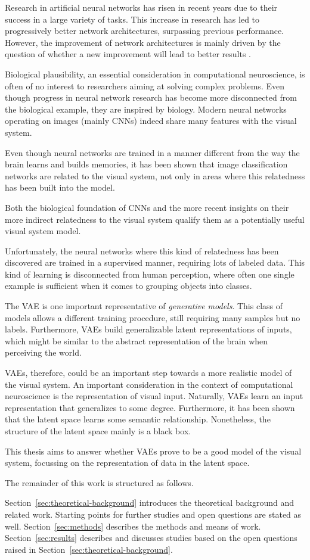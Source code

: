 Research in artificial neural networks has risen in recent years due to their success in a large variety of tasks.
This increase in research has led to progressively better network architectures, surpassing previous performance.
However, the improvement of network architectures is mainly driven by the question of whether a new improvement will lead to better results \citep{lindsay2020convolutional}.

Biological plausibility, an essential consideration in computational neuroscience, is often of no interest to researchers aiming at solving complex problems.
Even though progress in neural network research has become more disconnected from the biological example, they are inspired by biology.
Modern neural networks operating on images (mainly \acp{CNN}) indeed share many features with the visual system.

Even though neural networks are trained in a manner different from the way the brain learns and builds memories, it has been shown that image classification networks are related to the visual system, not only in areas where this relatedness has been built into the model.

Both the biological foundation of \acp{CNN} and the more recent insights on their more indirect relatedness to the visual system qualify them as a potentially useful visual system model.

Unfortunately, the neural networks where this kind of relatedness has been discovered are trained in a supervised manner, requiring lots of labeled data.
This kind of learning is disconnected from human perception, where often one single example is sufficient when it comes to grouping objects into classes.

The \ac{VAE} is one important representative of \textit{generative models}.
This class of models allows a different training procedure, still requiring many samples but no labels.
Furthermore, \acp{VAE} build generalizable latent representations of inputs, which might be similar to the abstract representation of the brain when perceiving the world.

\acp{VAE}, therefore, could be an important step towards a more realistic model of the visual system.
An important consideration in the context of computational neuroscience is the representation of visual input.
Naturally, \acp{VAE} learn an input representation that generalizes to some degree.
Furthermore, it has been shown that the latent space learns some semantic relationship.
Nonetheless, the structure of the latent space mainly is a black box.

This thesis aims to answer whether \acp{VAE} prove to be a good model of the visual system, focussing on the representation of data in the latent space.

The remainder of this work is structured as follows.

Section~\ref{sec:theoretical-background} introduces the theoretical background and related work.
Starting points for further studies and open questions are stated as well.
Section~\ref{sec:methods} describes the methods and means of work.
Section~\ref{sec:results} describes and discusses studies based on the open questions raised in Section~\ref{sec:theoretical-background}.